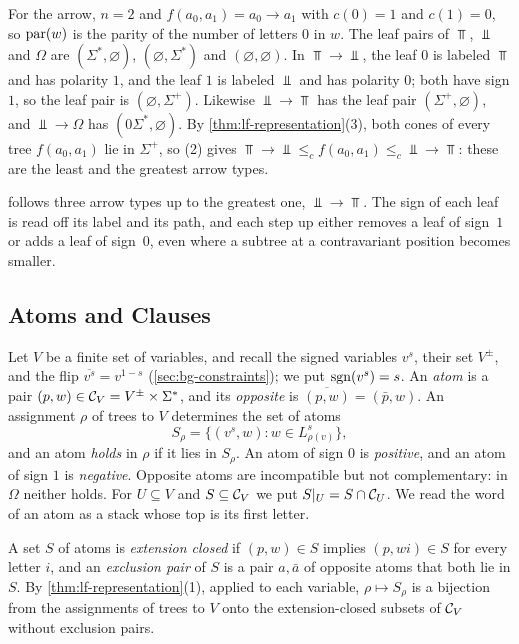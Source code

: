 \begin{example}\label{ex:lf-arrow}
For the arrow, $n=2$ and $f(a_0,a_1)=a_0\to a_1$ with $c(0)=1$ and $c(1)=0$, so
$\operatorname{par}(w)$ is the parity of the number of letters $0$ in $w$. The leaf pairs
of $\Top$, $\Bot$ and $\Omega$ are $(\Sigma^*,\varnothing)$,
$(\varnothing,\Sigma^*)$ and $(\varnothing,\varnothing)$. In $\Top\to\Bot$, the
leaf $0$ is labeled $\Top$ and has polarity $1$, and the leaf $1$ is labeled
$\Bot$ and has polarity $0$; both have sign $1$, so the leaf pair is
$(\varnothing,\Sigma^+)$. Likewise $\Bot\to\Top$ has the leaf pair
$(\Sigma^+,\varnothing)$, and $\Bot\to\Omega$ has $(0\Sigma^*,\varnothing)$. By
\cref{thm:lf-representation}(3), both cones of every tree $f(a_0,a_1)$ lie in
$\Sigma^+$, so (2) gives $\Top\to\Bot\le_c f(a_0,a_1)\le_c\Bot\to\Top$: these
are the least and the greatest arrow types.
\end{example}

 follows three arrow types up to the greatest one,
$\Bot\to\Top$. The sign of each leaf is read off its label and its path, and
each step up either removes a leaf of sign~$1$ or adds a leaf of sign~$0$, even
where a subtree at a contravariant position becomes smaller.



\subsection{Atoms and Clauses}\label{sec:lf-clauses}

Let $V$ be a finite set of variables, and recall the signed variables $v^s$,
their set $V^\pm$, and the flip $\overline{v^s}=v^{1-s}$
(\cref{sec:bg-constraints}); we put $\operatorname{sgn}(v^s)=s$. An \emph{atom} is a pair
$(p,w)\in\mathcal C_V=V^\pm\times\Sigma^*$, and its \emph{opposite} is
$\overline{(p,w)}=(\bar p,w)$. An assignment $\rho$ of trees to $V$
determines the set of atoms
\[
 S_\rho=\{(v^s,w):w\in L^s_{\rho(v)}\},
\]
and an atom \emph{holds} in $\rho$ if it lies in $S_\rho$. An atom of sign
$0$ is \emph{positive}, and an atom of sign $1$ is \emph{negative}. Opposite atoms are
incompatible but not complementary: in $\Omega$ neither holds. For
$U\subseteq V$ and $S\subseteq\mathcal C_V$ we put $S|_U=S\cap\mathcal C_U$. We read
the word of an atom as a stack whose top is its first letter.

A set $S$ of atoms is \emph{extension closed} if $(p,w)\in S$ implies
$(p,wi)\in S$ for every letter $i$, and an \emph{exclusion pair} of $S$ is a
pair $a,\bar a$ of opposite atoms that both lie in $S$. By
\cref{thm:lf-representation}(1), applied to each variable, $\rho\mapsto
S_\rho$ is a bijection from the assignments of trees to $V$ onto the
extension-closed subsets of $\mathcal C_V$ without exclusion pairs.

